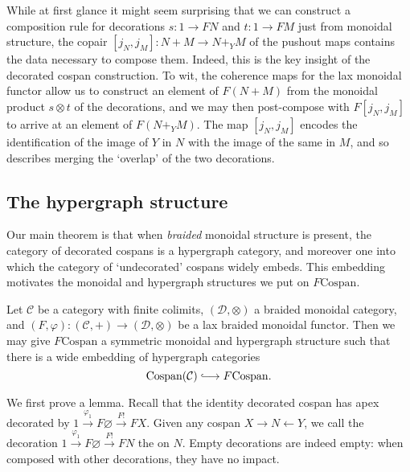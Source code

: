 \begin{remark}
While at first glance it might seem surprising that we can construct a
composition rule for decorations $s\colon  1\to FN$ and $t\colon  1 \to FM$ just from
monoidal structure, the copair $[j_N,j_M]\colon  N+M \to N+_YM$ of the pushout maps
contains the data necessary to compose them. Indeed, this is the key insight of the
decorated cospan construction. To wit, the coherence maps for the lax monoidal
functor allow us to construct an element of $F(N+M)$ from the monoidal product
$s \otimes t$ of the decorations, and we may then post-compose with $F[j_N,j_M]$ to
arrive at an element of $F(N+_YM)$. The map $[j_N,j_M]$ encodes the
identification of the image of $Y$ in $N$ with the image of the same in $M$, and
so describes merging the `overlap' of the two decorations.
\end{remark}


\subsection{The hypergraph structure}
Our main theorem is that when \emph{braided} monoidal structure is present, the
category of decorated cospans is a hypergraph category, and moreover one into
which the category of `undecorated' cospans widely embeds.  This embedding
motivates the monoidal and hypergraph structures we put on $F\mathrm{Cospan}$.

\begin{theorem} \label{thm:fcospans}
  Let $\mathcal C$ be a category with finite colimits, $(\mathcal D, \otimes)$ a
  braided monoidal category, and $(F,\varphi)\colon  (\mathcal C,+) \to (\mathcal D,
  \otimes)$ be a lax braided monoidal functor. Then we may give
  $F\mathrm{Cospan}$ a symmetric monoidal and hypergraph structure such that
  there is a wide embedding of hypergraph categories
  \[
    \mathrm{Cospan(\mathcal C)} \hooklongrightarrow F\mathrm{Cospan}.
  \]
\end{theorem}

We first prove a lemma.  Recall that the identity decorated cospan has apex
decorated by $1 \stackrel{\varphi_1}\longrightarrow F\varnothing
\stackrel{F!}\longrightarrow FX$. Given any cospan $X \to N \leftarrow Y$, we
call the decoration $1 \stackrel{\varphi_1}\longrightarrow F\varnothing
\stackrel{F!}\longrightarrow FN$ the  on $N$. Empty
decorations are indeed empty: when composed with other decorations, they have no
impact.

